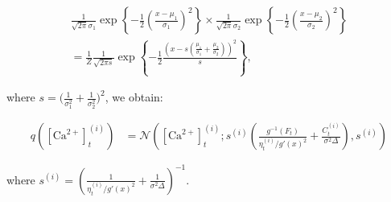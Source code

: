 \documentclass[12pt]{article}
\providecommand{\ve}[1]{\boldsymbol{#1}}
\providecommand{\ve}[1]{\boldsymbol{#1}}
\newcommand{\thetn}{\ve{\theta}}
\newcommand{\p}{P_{\thetn}}
\newcommand{\m}{m^{\ast}}
\newcommand{\Ca}{[\text{Ca}^{2+}]}
\begin{document}
\begin{multline} \label{eq:prod_gauss}
\frac{1}{\sqrt{2 \pi} \sigma_1} \exp\left\{-\frac{1}{2} \left(\frac{x-\mu_1}{\sigma_1}\right)^2\right\} \times \frac{1}{\sqrt{2 \pi} \sigma_2} \exp\left\{-\frac{1}{2} \left(\frac{x-\mu_2}{\sigma_2}\right)^2\right\} \\
= \frac{1}{Z} \frac{1}{\sqrt{2 \pi s}} \exp \left\{-\frac{1}{2} \frac{\left(x - s\left(\frac{\mu_1}{\sigma_1} + \frac{\mu_2}{\sigma_2}\right)\right)^2}{s}\right\}, 
\end{multline}

\noindent where $s=\big(\frac{1}{\sigma_1^2}+\frac{1}{\sigma_2^2}\big)^2$, we obtain:

\begin{align}
q(\Ca_t^{(i)}) &= \mathcal{N}\left(\Ca_t^{(i)}; s^{(i)} \left(\frac{g^{-1}(F_t)}{\eta_t^{(i)}/g'(x)^2} + \frac{C_t^{(i)}}{\sigma^2 \Delta}\right),s^{(i)} \right)
\end{align}

\noindent where  $s^{(i)}=\left(\frac{1}{\eta_t^{(i)}/g'(x)^2}+\frac{1}{\sigma^2 \Delta}\right)^{-1}$. %

%
%
%
%
%
\end{document}
